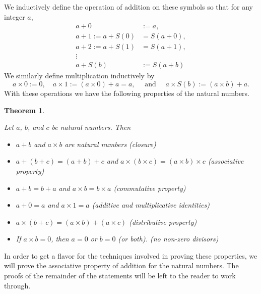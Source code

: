 \documentclass[
]{book}
\providecommand{\tightlist}{%
  \setlength{\itemsep}{0pt}\setlength{\parskip}{0pt}}
\newtheorem{theorem}{Theorem}[chapter]
\theoremstyle{definition}
\theoremstyle{definition}
\theoremstyle{definition}
\theoremstyle{definition}
\theoremstyle{remark}
\begin{document}
We inductively define the operation of addition on these symbols so that for any integer \(a\),
\begin{align*}
    a+0 &:=a, \\
    a+1 := a+S(0) &= S(a+0), \\
    a+2:=a+S(1) &= S(a+1), \\
    \vdots \\
    a+S(b) &:= S(a+b)
\end{align*}
We similarly define multiplication inductively by
\[a\times 0 := 0, \quad a\times 1 := (a \times 0)+a = a, \quad \mbox{ and } \quad a\times S(b) := (a\times b)+a.\]
With these operations we have the following properties of the natural numbers.

\begin{theorem}
\protect\hypertarget{thm:unlabeled-div-29}{}\label{thm:unlabeled-div-29}

Let \(a\), \(b\), and \(c\) be natural numbers. Then

\begin{itemize}
\tightlist
\item
  \(a+b\) and \(a\times b\) are natural numbers (closure)
\item
  \(a+(b+c)=(a+b)+c\) and \(a\times (b\times c)=(a\times b)\times c\) (associative property)
\item
  \(a+b=b+a\) and \(a\times b=b\times a\) (commutative property)
\item
  \(a+0=a\) and \(a\times 1 =a\) (additive and multiplicative identities)
\item
  \(a \times (b+c)= (a\times b) + (a\times c)\) (distributive property)
\item
  If \(a\times b=0\), then \(a=0\) or \(b=0\) (or both). (no non-zero divisors)
\end{itemize}

\end{theorem}

In order to get a flavor for the techniques involved in proving these properties, we will prove the associative property of addition for the natural numbers. The proofs of the remainder of the statements will be left to the reader to work through.
\end{document}
